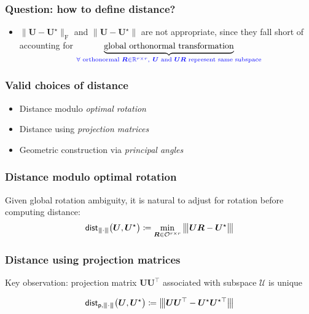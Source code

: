 \documentclass[compress,
mathserif,wide,%
]{beamer}
\begin{document}
\begin{frame}
\frametitle{Question: how to define distance?}

	\begin{itemize}
		\item  $\|\bm{U}-\bm{U}^\star\|_{\mathrm{F}}$ and $\|\bm{U}-\bm{U}^\star\|$ are not appropriate,  since they fall short of accounting for 
			\hspace{-3.5em} $\underset{\textcolor{blue}{ \forall\text{ orthonormal } \bm{R}\in \mathbb{R}^{r\times r}, ~\bm{U} \text{ and } \bm{U}\bm{R} \text{ represent same subspace}}}{\underbrace{\text{global orthonormal transformation}}}$ 
	
	\end{itemize}

\end{frame}

\begin{frame}
	\frametitle{Valid choices of distance}
	\begin{itemize}
		\item Distance modulo \emph{optimal rotation}
		\item Distance using \emph{projection matrices}
		\item Geometric construction via \emph{principal angles}
	\end{itemize}
\end{frame}


\begin{frame}
	\frametitle{Distance modulo optimal rotation}
	Given global rotation ambiguity, it is natural to adjust for rotation before computing distance:
	\begin{align*}
	\mathsf{dist}_{{\left\vert\kern-0.25ex\left\vert\kern-0.25ex\left\vert \cdot \right\vert\kern-0.25ex\right\vert\kern-0.25ex\right\vert}}\big(\bm{U},{\bm{U}}^{\star}\big) \coloneqq
	\min _{\bm{R}\in \mathcal{O}^{r\times r}} {\big\vert\kern-0.25ex\big\vert\kern-0.25ex\big\vert  \bm{U} \bm{R} - \bm{U}^{\star}   \big\vert\kern-0.25ex\big\vert\kern-0.25ex\big\vert} 
\end{align*}
\end{frame}

\begin{frame}
	\frametitle{Distance using projection matrices}
	Key observation: projection matrix $\bm{U} \bm{U}^{\top}$ associated with subspace $\mathcal{U}$ is unique

	\begin{equation*}
	\mathsf{dist}_{\mathsf{p},{\left\vert\kern-0.25ex\left\vert\kern-0.25ex\left\vert \cdot \right\vert\kern-0.25ex\right\vert\kern-0.25ex\right\vert}}\big(\bm{U},{\bm{U}}^{\star}\big) \coloneqq {\big\vert\kern-0.25ex\big\vert\kern-0.25ex\big\vert \bm{U} \bm{U}^{\top}- {\bm{U}}^{\star} {\bm{U}}^{\star\top} \big\vert\kern-0.25ex\big\vert\kern-0.25ex\big\vert}
\end{equation*}
\end{frame}
\end{document}
